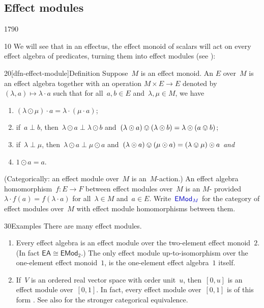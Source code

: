 \subsection{Effect modules}
\begin{parsec}{1790}%
\begin{point}{10}%
We will see that in an effectus,
    the effect monoid of scalars will act on
    every effect algebra of predicates,
    turning them into effect modules (see ):
\end{point}
\begin{point}{20}[dfn-effect-module]{Definition}%
Suppose~$M$ is an effect monoid.
An  $E$ over~$M$ \cite{corefl}
    is an effect algebra together with an operation
            $M \times E \to E$
            denoted by~$(\lambda, a) \mapsto \lambda \cdot a$
    such that for all~$a,b \in E$ and~$\lambda,\mu \in M$, we have
\begin{enumerate}
\item
    $(\lambda \odot \mu) \cdot a = \lambda \cdot (\mu \cdot a)$;
\item
    if~$a \perp b$,
     then~$\lambda \odot a \perp \lambda \odot b$
     and~$(\lambda \odot a) \ovee (\lambda\odot b) = \lambda \odot(a \ovee b)$;
\item
    if~$\lambda \perp \mu$,
     then~$\lambda \odot a \perp \mu \odot a$
     and~$(\lambda \odot a) \ovee (\mu \odot a) = (\lambda \ovee \mu) \odot a$
            \emph{and}
\item
    $1 \odot a = a$.
\end{enumerate}
(Categorically: an effect module over~$M$
    is an~$M$-action.)
An effect algebra homomorphism~$f\colon E \to F$
    between effect modules over~$M$
    is an $M$-
    provided~$\lambda \cdot f(a) = f(\lambda \cdot a)$
    for all~$\lambda \in M$ and~$a \in E$.
Write~$\Define{\mathsf{EMod}_M}$
    for the category of effect modules over~$M$
    with effect module homomorphisms between them.
\end{point}
\begin{point}{30}{Examples}%
There are many effect modules.
\begin{enumerate}
\item
Every effect algebra is an effect module over
    the two-element effect monoid~$2$.
    (In fact $\mathsf{EA} \cong \mathsf{EMod}_{2}$.)
The only effect module up-to-isomorphism over the one-element effect monoid~$1$,
    is the one-element effect algebra~$1$ itself.
\item
If~$V$ is an ordered real vector space with order unit~$u$,
    then~$[0,u]$ is an effect module over~$[0,1]$.
In fact, every effect module over~$[0,1]$
    is of this form \cite{gudder1998representation}.
See also \cite[Thm.~3]{jacobs2016expectation}
    for the stronger categorical equivalence.
\end{enumerate}
\end{point}
\end{parsec}

